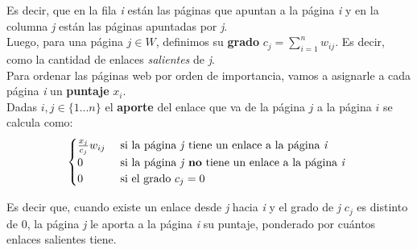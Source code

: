Es decir, que en la fila \textit{i} están las páginas que apuntan a la página \textit{i} y en la columna \textit{j} están las páginas apuntadas por \textit{j}. \\

Luego, para una página $j \in W$, definimos su \textbf{grado} $c_{j} = \sum_{i = 1}^{n} w_{ij}$. Es decir, como la cantidad de enlaces \textit{salientes} de \textit{j}. \\

Para ordenar las páginas web por orden de importancia, vamos a asignarle a cada página \textit{i} un \textbf{puntaje} $x_i$. \\

Dadas $i, j \in \{1...n\}$ el \textbf{aporte} del enlace que va de la página $j$ a la página $i$ se calcula como: \\

\[
	\begin{cases}
		\frac{x_j}{c_j}w_{ij} & \text{ si la página \textit{j} tiene un enlace a la página \textit{i} } \\
		0 & \text{ si la página \textit{j} \textbf{no} tiene un enlace a la página \textit{i} } \\
		0 & \text{ si el grado $c_j = 0$}
	\end{cases}
\]

Es decir que, cuando existe un enlace desde \textit{j} hacia \textit{i} y el grado de \textit{j} $c_j$ es distinto de $0$, la página \textit{j} le aporta a la página \textit{i} su puntaje, ponderado por cuántos enlaces salientes tiene.


